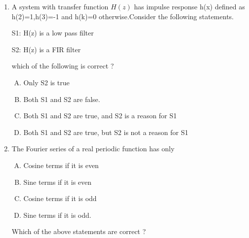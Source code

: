 \documentclass[journal,12pt,twocolumn]{IEEEtran}
\begin{document}
\begin{enumerate}
\begin{enumerate}[(A)]
\begin{multicols}{2}
\end{multicols}
\end{enumerate}

\item A system with transfer function $H(z)$ has impulse response h(x) defined as h(2)=1,h(3)=-1 and h(k)=0 otherwise.Consider the following statements.
     \begin{center}
     S1: H(z) is a low pass filter\end{center} \begin{center}
     
    S2: H(z) is a FIR filter \end{center} 
     
which of the following is correct ?

\begin{enumerate}[(A)]

\setlength\itemsep{1em}

\item Only S2 is true
\item Both S1 and S2 are false.
\item Both S1 and S2 are true, and S2 is a reason for S1
\item Both S1 and S2 are true, but S2 is not a reason for S1

\end{enumerate}

\item The Fourier series of a real periodic function has only

\begin{enumerate}[(P)]
\setlength\itemsep{2em}

\item Cosine terms if it is even
\item Sine terms if it is even
\item Cosine terms if it is odd
\item Sine terms if it is odd.

\end{enumerate}
Which of the above statements are correct ?
\begin{enumerate}[(A)]
\end{enumerate}
\end{enumerate}
\end{document}
